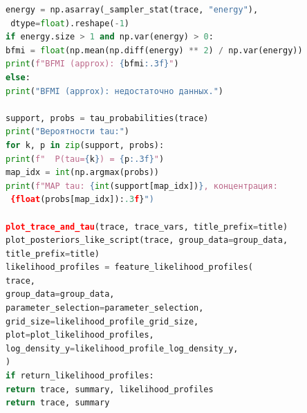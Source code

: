 \documentclass[14pt]{mmcs_article}
\begin{document}
\begin{lstlisting}[language=Python, caption={Полная реализация \texttt{\_build\_prior}}, label=app-lst:bayes-model]
energy = np.asarray(_sampler_stat(trace, "energy"),
 dtype=float).reshape(-1)
if energy.size > 1 and np.var(energy) > 0:
bfmi = float(np.mean(np.diff(energy) ** 2) / np.var(energy))
print(f"BFMI (approx): {bfmi:.3f}")
else:
print("BFMI (approx): недостаточно данных.")

support, probs = tau_probabilities(trace)
print("Вероятности tau:")
for k, p in zip(support, probs):
print(f"  P(tau={k}) = {p:.3f}")
map_idx = int(np.argmax(probs))
print(f"MAP tau: {int(support[map_idx])}, концентрация:
 {float(probs[map_idx]):.3f}")

plot_trace_and_tau(trace, trace_vars, title_prefix=title)
plot_posteriors_like_script(trace, group_data=group_data, 
title_prefix=title)
likelihood_profiles = feature_likelihood_profiles(
trace,
group_data=group_data,
parameter_selection=parameter_selection,
grid_size=likelihood_profile_grid_size,
plot=plot_likelihood_profiles,
log_density_y=likelihood_profile_log_density_y,
)
if return_likelihood_profiles:
return trace, summary, likelihood_profiles
return trace, summary
		
	\end{lstlisting}
	
	
\end{document}
